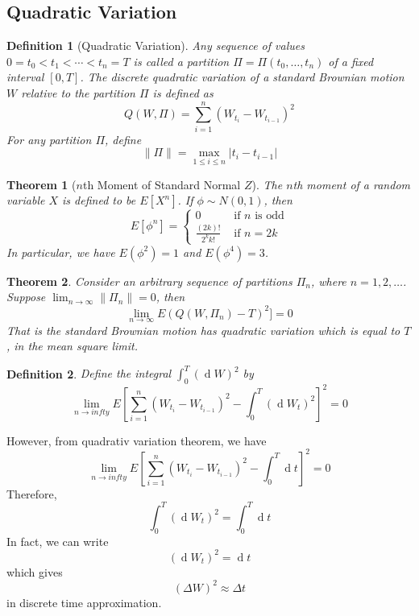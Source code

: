 \documentclass[12pt]{article}
\newtheorem{definition}{Definition}[section]
\newtheorem{theorem}{Theorem}[section]
\theoremstyle{definition}
\DeclareMathOperator{\diff}{d}
\begin{document}
\subsection{Quadratic Variation}
\begin{definition}[Quadratic Variation]
Any sequence of values $0=t_0<t_1<\cdots<t_n=T$ is called a partition $\Pi=\Pi(t_0,\ldots, t_n)$ of a fixed interval $[0,T]$. The discrete quadratic variation of a standard Brownian motion $W$ relative to the partition $\Pi$ is defined as
\[
Q(W,\Pi) = \sum_{i=1}^n (W_{t_i}-W_{t_{i-1}})^2
\]
For any partition $\Pi$, define
\[
\|\Pi\| = \max_{1\leq i\leq n}|t_i-t_{i-1}|
\]
\end{definition}
\begin{theorem}[{$n$}th Moment of Standard Normal {$Z$}]
\normalfont The $n$th moment of a random variable $X$ is defined to be $E[X^n]$. If $\phi\sim N(0,1)$, then
\[
E[\phi^n] = \begin{cases}
0&\text{ if }n\text{ is odd}\\
\frac{(2k)!}{2^kk!}&\text{ if }n=2k
\end{cases}
\]
In particular, we have $E(\phi^2) = 1$ and $E(\phi^4) = 3$.
\end{theorem}
\begin{theorem}
\normalfont Consider an arbitrary sequence of partitions $\Pi_n$, where $n = 1,2,\ldots$. Suppose $\lim_{n\to \infty} \|\Pi_n\|=0$, then
\[
\lim_{n\to \infty} E(Q(W,\Pi_n)-T)^2] = 0
\]
That is the standard Brownian motion has quadratic variation which is equal to $T$, in the mean square limit.
\end{theorem}
\begin{definition}
\normalfont Define the integral $\int_0^T (\diff W)^2$ by
\[
\lim_{n\to infty} E[\sum_{i=1}^n (W_{t_i}-W_{t_{i-1}})^2 - \int_0^T(\diff W_t)^2]^2 = 0
\]
\end{definition}
However, from quadrativ variation theorem, we have
\[
\lim_{n\to infty} E[\sum_{i=1}^n (W_{t_i}-W_{t_{i-1}})^2 - \int_0^T\diff t]^2 = 0
\]
Therefore,
\[
\int_0^T(\diff W_t)^2=\int_0^T\diff t
\]
In fact, we can write
\[
(\diff W_t)^2 = \diff t
\]
which gives
\[
(\Delta W)^2 \approx \Delta t
\]
in discrete time approximation.
\end{document}
